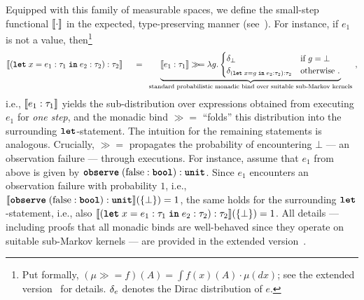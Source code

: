 Equipped with this family of measurable spaces, we define the small-step functional $\llbracket \cdot \rrbracket$ in the expected, type-preserving manner (see~\cite[Tables~1 and~2]{Wu2026SliceExtended}). For instance, if $e_1$ is not a value, then\footnote{Put formally, $(\mu \gg\!= f)(A) = \int f(x)(A) \cdot \mu(dx)$; see the extended version~\cite[Definition~F.28]{Wu2026SliceExtended} for details. $\delta_{e}$ denotes the Dirac distribution of $e$.}
%
\[
	\llbracket (\textnormal{\ttfamily\bfseries let} \; x = e_1 : \tau_1 \; \textnormal{\ttfamily\bfseries in} \; e_2 : \tau_2) : \tau_2 \rrbracket
	\quad~{}={}~
	\underbrace{\llbracket  e_1 : \tau_1  \rrbracket \gg\!=  \lambda g. 
		\begin{cases}
			\delta_{\bot} & \text{if $g=\bot$} \\
		\delta_{(\textnormal{\ttfamily\bfseries let} \; x = g \; \textnormal{\ttfamily\bfseries in} \; e_2 : \tau_2) : \tau_2} & \text{otherwise}~.
		\end{cases}
	}_{\text{standard probabilistic monadic bind over suitable sub-Markov kernels}}~,
\]
%
i.e., $\llbracket  e_1 : \tau_1 \rrbracket$ yields the sub-distribution over expressions obtained from executing $e_1$ for \emph{one step}, and the monadic bind $\gg\!=$ \enquote{folds} this distribution into the surrounding $\textnormal{\ttfamily\bfseries let}$-statement. The intuition for the remaining statements is analogous. Crucially, $\gg\!=$ propagates the probability of encountering $\bot$ --- an observation failure --- through executions. For instance, assume that $e_1$ from above is given by $\textnormal{\ttfamily\bfseries observe}\; (\textnormal{false} : \textnormal{\ttfamily\bfseries bool})  : \textnormal{\ttfamily\bfseries unit}$. Since $e_1$ encounters an observation failure with probability $1$, i.e., $\llbracket \textnormal{\ttfamily\bfseries observe}\; (\textnormal{false} : \textnormal{\ttfamily\bfseries bool})  : \textnormal{\ttfamily\bfseries unit} \rrbracket(\{\bot\}) = 1$, the same holds for the surrounding $\textnormal{\ttfamily\bfseries let}$-statement, i.e., also $\llbracket (\textnormal{\ttfamily\bfseries let} \; x = e_1 : \tau_1 \; \textnormal{\ttfamily\bfseries in} \; e_2 : \tau_2) : \tau_2 \rrbracket(\{\bot\})=1$.
%
All details --- including proofs that all monadic binds are well-behaved since they operate on suitable sub-Markov kernels --- are provided in the extended version~\cite[\S~F.4]{Wu2026SliceExtended}.

